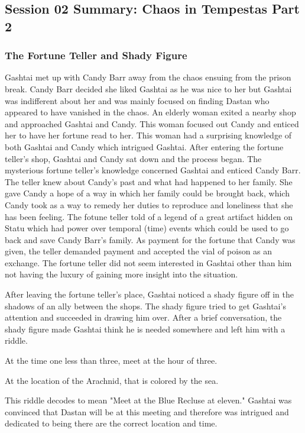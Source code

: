 \subsection{Session 02 Summary: Chaos in Tempestas Part 2}

\subsubsection{The Fortune Teller and Shady Figure}

Gashtai met up with Candy Barr away from the chaos ensuing from the prison break. Candy Barr decided she liked Gashtai as he was nice to her but Gashtai was indifferent about her and was mainly focused on finding Dastan who appeared to have vanished in the chaos. An elderly woman exited a nearby shop and approached Gashtai and Candy. This woman focused out Candy and enticed her to have her fortune read to her. This woman had a surprising knowledge of both Gashtai and Candy which intrigued Gashtai. After entering the fortune teller's shop, Gashtai and Candy sat down and the process began. The mysterious fortune teller's knowledge concerned Gashtai and enticed Candy Barr. The teller knew about Candy's past and what had happened to her family. She gave Candy a hope of a way in which her family could be brought back, which Candy took as a way to remedy her duties to reproduce and loneliness that she has been feeling. The fotune teller told of a legend of a great artifact hidden on Statu which had power over temporal (time) events which could be used to go back and save Candy Barr's family. As payment for the fortune that Candy was given, the teller demanded payment and accepted the vial of poison as an exchange. The fortune teller did not seem interested in Gashtai other than him not having the luxury of gaining more insight into the situation.

After leaving the fortune teller's place, Gashtai noticed a shady figure off in the shadows of an ally between the shops. The shady figure tried to get Gashtai's attention and succeeded in drawing him over. After a brief conversation, the shady figure made Gashtai think he is needed somewhere and left him with a riddle.

\begin{center}
	At the time one less than three, meet at the hour of three.
	
	At the location of the Arachnid, that is colored by the sea.
\end{center}

This riddle decodes to mean "Meet at the Blue Recluse at eleven." Gashtai was convinced that Dastan will be at this meeting and therefore was intrigued and dedicated to being there are the correct location and time. 

